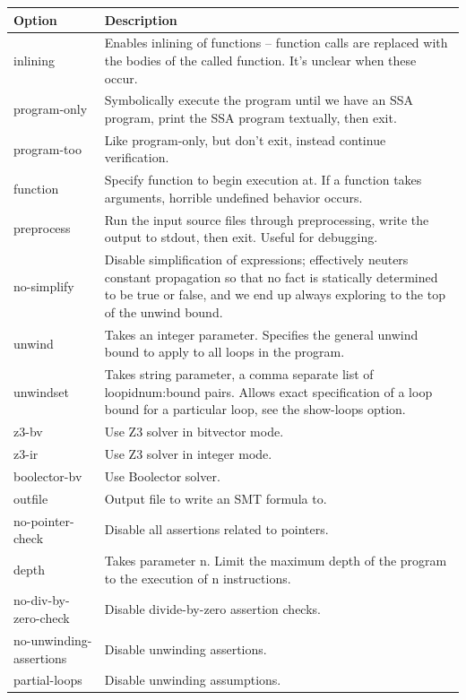 \documentclass{article}
\begin{document}
\begin{longtable}{| p{} | p{} |}
\hline
Option & Description\\
\hline
inlining & Enables inlining of functions -- function calls are replaced with the
bodies of the called function. It's unclear when these occur.\\
\hline
program-only & Symbolically execute the program until we have an SSA program,
print the SSA program textually, then exit.\\
\hline
program-too & Like program-only, but don't exit, instead continue
verification.\\
\hline
function & Specify function to begin execution at. If a function takes arguments,
horrible undefined behavior occurs.\\
\hline
preprocess & Run the input source files through preprocessing, write the output
to stdout, then exit. Useful for debugging.\\
\hline
no-simplify & Disable simplification of expressions; effectively neuters
constant propagation so that no fact is statically determined to be true or
false, and we end up always exploring to the top of the unwind bound.\\
\hline
unwind & Takes an integer parameter. Specifies the general unwind bound to apply
to all loops in the program.\\
\hline
unwindset & Takes string parameter, a comma separate list of loopidnum:bound
pairs. Allows exact specification of a loop bound for a particular loop, see
the show-loops option.\\
\hline
z3-bv & Use Z3 solver in bitvector mode.\\
\hline
z3-ir & Use Z3 solver in integer mode.\\
\hline
boolector-bv & Use Boolector solver.\\
\hline
outfile & Output file to write an SMT formula to.\\
\hline
no-pointer-check & Disable all assertions related to pointers.\\
\hline
depth & Takes parameter n. Limit the maximum depth of the program to the
execution of n instructions.\\
\hline
no-div-by-zero-check & Disable divide-by-zero assertion checks.\\
\hline
no-unwinding-assertions & Disable unwinding assertions.\\
\hline
partial-loops & Disable unwinding assumptions.\\
\hline

\end{longtable}
\end{document}
